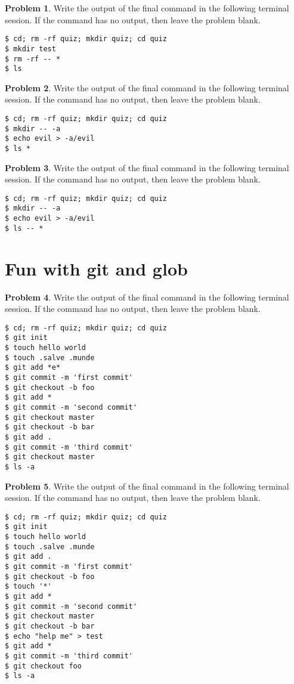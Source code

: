 \documentclass[10pt]{article}
\theoremstyle{definition}
\newtheorem{problem}{Problem}
\begin{document}
\filbreak
\begin{problem}
    Write the output of the final command in the following terminal session.
    If the command has no output, then leave the problem blank.
\end{problem}
\begin{lstlisting}
$ cd; rm -rf quiz; mkdir quiz; cd quiz
$ mkdir test
$ rm -rf -- *
$ ls
\end{lstlisting}

\filbreak
\begin{problem}
    Write the output of the final command in the following terminal session.
    If the command has no output, then leave the problem blank.
\end{problem}
\begin{lstlisting}
$ cd; rm -rf quiz; mkdir quiz; cd quiz
$ mkdir -- -a
$ echo evil > -a/evil
$ ls *
\end{lstlisting}

\filbreak
\begin{problem}
    Write the output of the final command in the following terminal session.
    If the command has no output, then leave the problem blank.
\end{problem}
\begin{lstlisting}
$ cd; rm -rf quiz; mkdir quiz; cd quiz
$ mkdir -- -a
$ echo evil > -a/evil
$ ls -- *
\end{lstlisting}

\filbreak
\section{Fun with git and glob}

\begin{problem}
    Write the output of the final command in the following terminal session.
    If the command has no output, then leave the problem blank.
\end{problem}
\begin{lstlisting}
$ cd; rm -rf quiz; mkdir quiz; cd quiz
$ git init
$ touch hello world
$ touch .salve .munde
$ git add *e*
$ git commit -m 'first commit'
$ git checkout -b foo
$ git add *
$ git commit -m 'second commit'
$ git checkout master
$ git checkout -b bar
$ git add .
$ git commit -m 'third commit'
$ git checkout master
$ ls -a
\end{lstlisting}

\filbreak
\begin{problem}
    Write the output of the final command in the following terminal session.
    If the command has no output, then leave the problem blank.
\end{problem}
\begin{lstlisting}
$ cd; rm -rf quiz; mkdir quiz; cd quiz
$ git init
$ touch hello world
$ touch .salve .munde
$ git add .
$ git commit -m 'first commit'
$ git checkout -b foo
$ touch '*'
$ git add *
$ git commit -m 'second commit'
$ git checkout master
$ git checkout -b bar
$ echo "help me" > test
$ git add *
$ git commit -m 'third commit'
$ git checkout foo
$ ls -a
\end{lstlisting}
\end{document}
